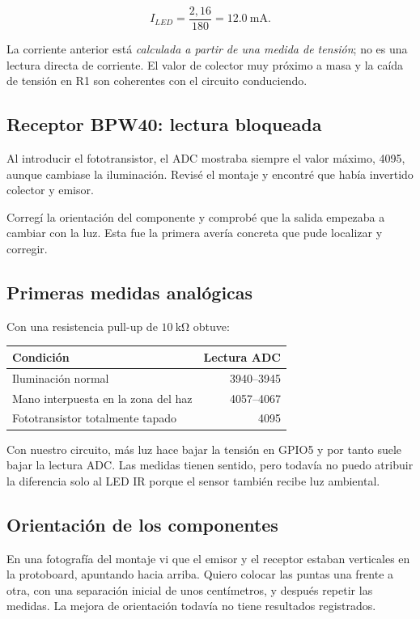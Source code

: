 \documentclass[10pt,a4paper]{article}
\begin{document}
\begin{equation}
I_{LED}=\frac{2{,}16}{180}=\SI{12.0}{\milli\ampere}.
\end{equation}

La corriente anterior está \emph{calculada a partir de una medida de tensión}; no es una lectura directa de corriente. El valor de colector muy próximo a masa y la caída de tensión en R1 son coherentes con el circuito conduciendo.

\subsection{Receptor BPW40: lectura bloqueada}
Al introducir el fototransistor, el ADC mostraba siempre el valor máximo, 4095, aunque cambiase la iluminación. Revisé el montaje y encontré que había invertido colector y emisor.

Corregí la orientación del componente y comprobé que la salida empezaba a cambiar con la luz. Esta fue la primera avería concreta que pude localizar y corregir.

\subsection{Primeras medidas analógicas}
Con una resistencia pull-up de $\SI{10}{\kilo\ohm}$ obtuve:
\begin{center}
\begin{tabularx}{\linewidth}{@{}X r@{}}
\toprule
Condición & Lectura ADC\\
\midrule
Iluminación normal & 3940--3945\\
Mano interpuesta en la zona del haz & 4057--4067\\
Fototransistor totalmente tapado & 4095\\
\bottomrule
\end{tabularx}
\end{center}

Con nuestro circuito, más luz hace bajar la tensión en GPIO5 y por tanto suele bajar la lectura ADC. Las medidas tienen sentido, pero todavía no puedo atribuir la diferencia solo al LED IR porque el sensor también recibe luz ambiental.

\subsection{Orientación de los componentes}
En una fotografía del montaje vi que el emisor y el receptor estaban verticales en la protoboard, apuntando hacia arriba. Quiero colocar las puntas una frente a otra, con una separación inicial de unos centímetros, y después repetir las medidas. La mejora de orientación todavía no tiene resultados registrados.
\end{document}
